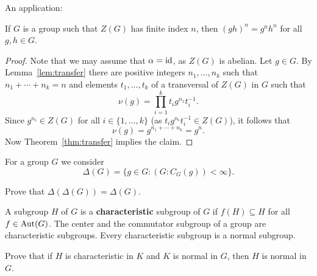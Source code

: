 
An application:

\begin{proposition}
	\label{pro:center}
	If $G$ is a group such that $Z(G)$ has finite index $n$, then
	$(gh)^n=g^nh^n$ for all $g,h\in G$.	
\end{proposition}

\begin{proof}
	Note that we may assume that $\alpha=\operatorname{id}$, as $Z(G)$ is
	abelian. Let $g\in G$. By Lemma~\ref{lem:transfer} there are positive integers 
    $n_1,\dots,n_k$ such that $n_1+\cdots+n_k=n$ and elements 
	$t_1,\dots,t_k$ of a transversal of $Z(G)$ in $G$ such that 
	\[
		\nu(g)=\prod_{i=1}^k t_ig^{n_1}t_i^{-1}.
	\]
	Since $g^{n_i}\in Z(G)$ for all $i\in\{1,\dots,k\}$ (as $t_ig^{n_i}t_i^{-1}\in Z(G)$), 
	it follows that 
	\[
	\nu(g)=g^{n_1+\cdots+n_k}=g^n.
	\]
	Now Theorem~\ref{thm:transfer} implies the claim.
\end{proof}

For a group $G$ we consider 
\[
	\Delta(G)=\{g\in G:(G:C_G(g))<\infty\}.
\]

\begin{exercise}
	Prove that $\Delta(\Delta(G))=\Delta(G)$.
\end{exercise}

A subgroup $H$ of $G$ is a \textbf{characteristic} subgroup of $G$ 
if $f(H)\subseteq H$ for all $f\in\operatorname{Aut}(G)$. The center 
and the commutator subgroup of a group are characteristic subgroups. 
Every characteristic subgroup is a normal subgroup. 

\begin{exercise}
    Prove that if $H$ is characteristic in $K$ and $K$ is normal in $G$, then 
    $H$ is normal in $G$.
\end{exercise}

